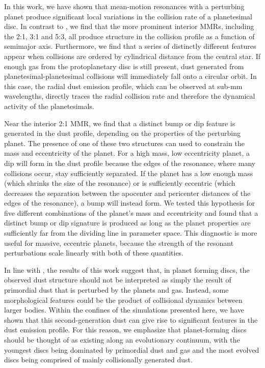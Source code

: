 \documentclass[fleqn,usenatbib]{mnras}
\begin{document}
In this work, we have shown that mean-motion resonances with a perturbing planet produce significant local variations in the collision rate of a 
planetesimal disc. In contrast to \citet{2000Icar..143...45R}, we find that the more prominent interior MMRs, including the 2:1, 3:1 and 5:3, all 
produce structure in the collision profile as a function of semimajor axis. Furthermore, we find that a series of distinctly different features appear 
when collisions are ordered by cylindrical distance from the central star. If enough gas from the protoplanetary disc is still present, dust generated 
from planetesimal-planetesimal collisions will immediately fall onto a circular orbit. In this case, the radial dust emission profile, 
which can be observed at sub-mm wavelengths, directly traces the radial collision rate and therefore the dynamical activity of the planetesimals.

Near the interior 2:1 MMR, we find that a distinct bump or dip feature is generated in the dust profile, depending on the properties of the perturbing 
planet. The presence of one of these two structures can used to constrain the mass and eccentricity of the planet. For a high mass, low eccentricity 
planet, a dip will form in the dust profile because the edges of the resonance, where many collisions occur, stay sufficiently separated. If the planet 
has a low enough mass (which shrinks the size of the resonance) or is sufficiently eccentric (which decreases the separation between the apocenter 
and pericenter distances of the edges of the resonance), a bump will instead form. We tested this hypothesis for five different combinations of the 
planet's mass and eccentricity and found that a distinct bump or dip signature is produced as long as the planet properties are sufficiently far from 
the dividing line in parameter space. This diagnostic is more useful for massive, eccentric planets, because the strength of the resonant 
perturbations scale linearly with both of these quantities.

In line with \citet{2017ApJ...850..103B}, the results of this work suggest that, in planet forming discs, the observed dust structure should not be 
interpreted as simply the result of primordial dust that is perturbed by the planets and gas. Instead, some morphological features could be the product 
of collisional dynamics between larger bodies. Within the confines of the simulations presented here, we have shown that this second-generation dust 
can give rise to significant features in the dust emission profile. For this reason, we emphasize that planet-forming discs should be thought of as 
existing along an evolutionary continuum, with the youngest discs being dominated by primordial dust and gas and the most evolved discs being 
comprised of mainly collisionally generated dust.
\end{document}
